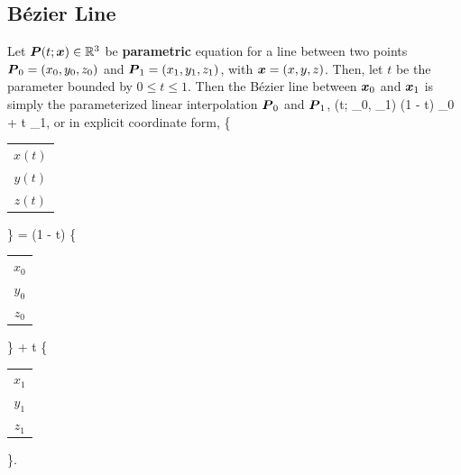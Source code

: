\subsection{B\'ezier Line}
Let $\mbox{\boldmath $P$}(t; \mbox{\boldmath $x$}) \in \mathbb{R}^3$ be {\bf parametric} equation for a line between 
two points $\mbox{\boldmath $P$}_0 = (x_0, y_0, z_0)$ and $\mbox{\boldmath $P$}_1 = (x_1, y_1, z_1)$, with
$\mbox{\boldmath $x$} = (x, y, z)$.
Then, let $t$ be the parameter bounded by $0 \leq t \leq 1$.  Then 
the B\'ezier line between $\mbox{\boldmath $x$}_0$ and $\mbox{\boldmath $x$}_1$ is simply the parameterized 
linear interpolation $\mbox{\boldmath $P$}_0$ and $\mbox{\boldmath $P$}_1$, 
\be
\vP(t; \vP_0, \vP_1)  (1 - t) \vP_0 + t \vP_1, 
\ee
or in explicit coordinate form,
\be
\left\{\begin{tabular}{c} $x(t)$ \\ $y(t)$ \\ $z(t)$ \end{tabular} \right\}
= 
(1 - t)
\left\{\begin{tabular}{c} $x_0$ \\ $y_0$ \\ $z_0$ \end{tabular} \right\}
+ 
t \left\{\begin{tabular}{c} $x_1$ \\ $y_1$ \\ $z_1$ \end{tabular} \right\}.
\ee

